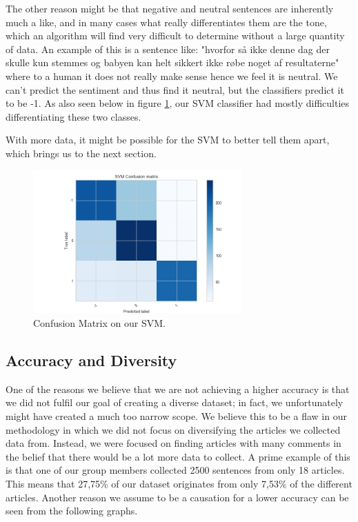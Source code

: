 The other reason might be that negative and neutral sentences are inherently much a like, and in many cases what really differentiates them are the tone, which an algorithm will find very difficult to determine without a large quantity of data. An example of this is a sentence like: "hvorfor så ikke denne dag der skulle kun stemmes og babyen kan helt sikkert ikke røbe noget af resultaterne" where to a human it does not really make sense hence we feel it is neutral. We can't predict the sentiment and thus find it neutral, but the classifiers predict it to be -1. As also seen below in figure \ref{negandneu}, our SVM classifier had mostly difficulties differentiating these two classes.

With more data, it might be possible for the SVM to better tell them apart, which brings us to the next section.
\begin{figure}[H]
	\includegraphics[width=8cm]{Images/ConfusionMatrixThreeClassesSVM}
	\caption{Confusion Matrix on our SVM.}
	\label{negandneu}
\end{figure}


\subsection{Accuracy and Diversity} \label{learningcurve}
One of the reasons we believe that we are not achieving a higher accuracy is that we did not fulfil our goal of creating a diverse dataset; in fact, we unfortunately might have created a much too narrow scope. We believe this to be a flaw in our methodology in which we did not focus on diversifying the articles we collected data from. Instead, we were focused on finding articles with many comments in the belief that there would be a lot more data to collect. A prime example of this is that one of our group members collected 2500 sentences from only 18 articles. This means that 27,75\% of our dataset originates from only 7,53\% of the different articles. Another reason we assume to be a causation for a lower accuracy can be seen from the following graphs.


